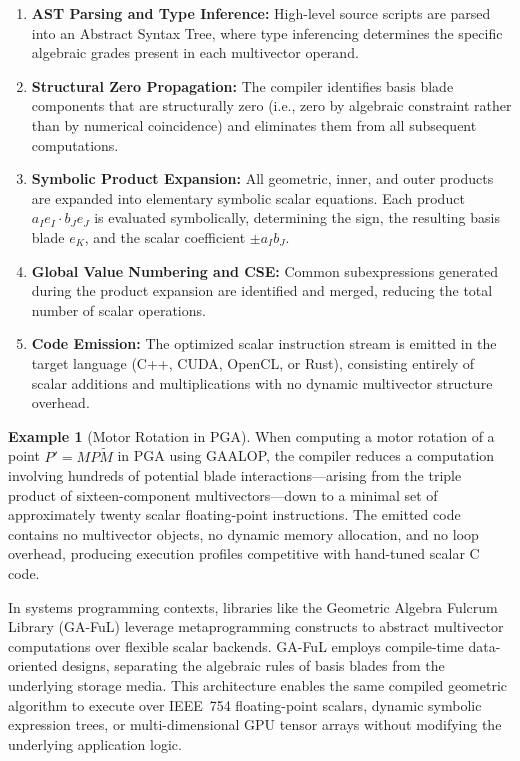 \documentclass[manuscript, nonacm, review=false]{acmart}
\theoremstyle{definition}
\newtheorem{example}[definition]{Example}
\theoremstyle{plain}
\begin{document}
\begin{enumerate}[label=\textbf{S\arabic*.}]
    \item \textbf{AST Parsing and Type Inference:} High-level source scripts are parsed into an Abstract Syntax Tree, where type inferencing determines the specific algebraic grades present in each multivector operand.
    
    \item \textbf{Structural Zero Propagation:} The compiler identifies basis blade components that are structurally zero (i.e., zero by algebraic constraint rather than by numerical coincidence) and eliminates them from all subsequent computations.
    
    \item \textbf{Symbolic Product Expansion:} All geometric, inner, and outer products are expanded into elementary symbolic scalar equations. Each product $a_I e_I \cdot b_J e_J$ is evaluated symbolically, determining the sign, the resulting basis blade $e_K$, and the scalar coefficient $\pm a_I b_J$.
    
    \item \textbf{Global Value Numbering and CSE:} Common subexpressions generated during the product expansion are identified and merged, reducing the total number of scalar operations.
    
    \item \textbf{Code Emission:} The optimized scalar instruction stream is emitted in the target language (C++, CUDA, OpenCL, or Rust), consisting entirely of scalar additions and multiplications with no dynamic multivector structure overhead.
\end{enumerate}

\begin{example}[Motor Rotation in PGA]
\label{ex:motor_gaalop}
When computing a motor rotation of a point $P' = M P \widetilde{M}$ in PGA using GAALOP, the compiler reduces a computation involving hundreds of potential blade interactions---arising from the triple product of sixteen-component multivectors---down to a minimal set of approximately twenty scalar floating-point instructions. The emitted code contains no multivector objects, no dynamic memory allocation, and no loop overhead, producing execution profiles competitive with hand-tuned scalar C code.
\end{example}

In systems programming contexts, libraries like the Geometric Algebra Fulcrum Library (GA-FuL) leverage metaprogramming constructs to abstract multivector computations over flexible scalar backends. GA-FuL employs compile-time data-oriented designs, separating the algebraic rules of basis blades from the underlying storage media. This architecture enables the same compiled geometric algorithm to execute over IEEE~754 floating-point scalars, dynamic symbolic expression trees, or multi-dimensional GPU tensor arrays without modifying the underlying application logic.
\end{document}
